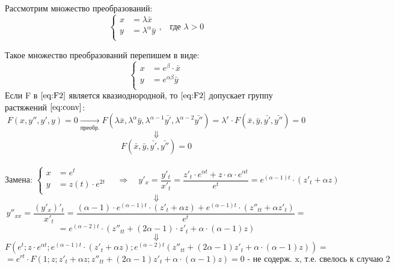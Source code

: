 \begin{corollary}
\begin{enumerate}
		  Рассмотрим множество преобразований:
		  \begin{equation} \label{eq:conv}
		  \left\{
		  \begin{aligned} 
		  	x &= \lambda \bar{x}  \\
		  	y &= \lambda^{\alpha} \bar{y}\\   
		  \end{aligned}
		  \right.\text{,}  \quad  \text{где } \lambda > 0                                            
		  \end{equation}

		  Такое множество преобразований перепишем в виде: 
		 \[
			\left\{
			\begin{aligned}
				x &= e^{\beta} \cdot \bar{x}  \\
				y &= e^{\alpha \beta} \bar{y} \\   
			\end{aligned}
			\right.                                                          
		\]
		Если F в $\eqref{eq:F2}$ является квазиоднородной, то $\eqref{eq:F2}$ допускает группу растяжений $\eqref{eq:conv}$: \\
		\[
			\boxed{F(x, y'', y', y) = 0} \xrightarrow[\text{преобр.}]{} F(\lambda \bar{x}, \lambda^{\alpha} \bar{y}, \lambda^{\alpha - 1} \bar{y'}, \lambda^{\alpha - 2} \bar{y''}) = \lambda^{r} \cdot F(\bar{x}, \bar{y}, \bar{y'}, \bar{y''}) = 0
		\]
		\[
			\Downarrow
		\]
		\[
		 	F(\bar{x}, \bar{y}, \bar{y'}, \bar{y''}) = 0
		\]
		\ \\
	    \[
		\text{Замена: }\left\{
		\begin{aligned}
			x &= e^{t}  \\
			y &= z(t) \cdot e^{2t}\\   
		\end{aligned}
		\right. \quad
		\Rightarrow  \quad y'_x = \frac{y'_t}{x'_t} = \frac{z'_t \cdot e^{\alpha t} +  z \cdot \alpha \cdot e^{\alpha t}}{e^t} =  e^{(\alpha  -  1)t} \cdot (z'_t  + \alpha z)                                              
		\]
		\[
		  \Downarrow
		\]
		\[
			y''_{xx} = \frac{(y'_x)'_t}{x'_t} = \frac{(\alpha - 1) \cdot e^{(\alpha - 1)t} \cdot (z'_t + \alpha z) + e^{(\alpha - 1)t} \cdot (z''_{tt} + \alpha z'_t)}{e^t} = 
		\]	
		\[	
			= e^{(\alpha - 2)t} \cdot (z''_{tt} + (2\alpha - 1)\cdot z'_t + \alpha \cdot (\alpha - 1)z)
		\]
		\[
		  \Downarrow
		\]
		\[
			F(e^t; z \cdot e^{\alpha t}; e^{(\alpha - 1)t} \cdot (z'_t + \alpha z); e^{(\alpha - 2)t}(z''_{tt} + (2\alpha - 1)z'_t + \alpha \cdot (\alpha - 1)z) ) =
		\]
		\[
			= e^{rt} \cdot F(1; z; z'_t + \alpha z; z''_{tt} + (2\alpha - 1)z'_t + \alpha \cdot (\alpha - 1)z) = 0 \text{ -  не содерж. x, т.е. свелось к случаю 2}
		\]
	\end{enumerate}
\end{corollary}
\newpage
